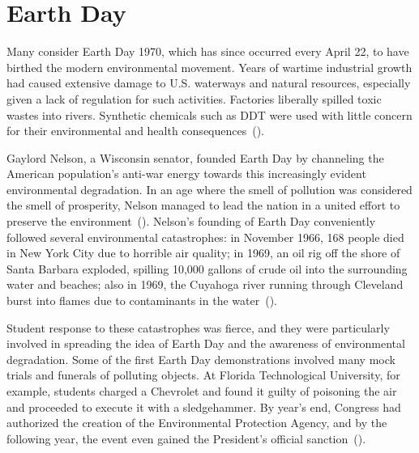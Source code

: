 \documentclass[12pt,letterpaper]{article}
\renewcommand{\citep}[1]{(\cite{#1})}
\begin{document}
%

\section*{Earth Day}

Many consider Earth Day 1970, which has since occurred every April 22, to have
birthed the modern environmental movement. Years of wartime industrial growth
had caused extensive damage to U.S. waterways and natural resources, especially
given a lack of regulation for such activities. Factories liberally spilled
toxic wastes into rivers. Synthetic chemicals such as DDT were used with little
concern for their environmental and health consequences~\citep{green2015}.

Gaylord Nelson, a Wisconsin senator, founded Earth Day by channeling the
American population's anti-war energy towards this increasingly evident
environmental degradation. In an age where the smell of pollution was
considered the smell of prosperity, Nelson managed to lead the nation in
a united effort to preserve the environment~\citep{edn2015}. Nelson's founding
of Earth Day conveniently followed several environmental catastrophes: in
November 1966, 168 people died in New York City due to horrible air quality; in
1969, an oil rig off the shore of Santa Barbara exploded, spilling 10,000
gallons of crude oil into the surrounding water and beaches; also in 1969, the
Cuyahoga river running through Cleveland burst into flames due to contaminants
in the water~\citep{green2015}.

Student response to these catastrophes was fierce, and they were particularly
involved in spreading the idea of Earth Day and the awareness of environmental
degradation. Some of the first Earth Day demonstrations involved many mock
trials and funerals of polluting objects. At Florida Technological University,
for example, students charged a Chevrolet and found it guilty of poisoning the
air and proceeded to execute it with a sledgehammer. By year's end, Congress
had authorized the creation of the Environmental Protection Agency, and by the
following year, the event even gained the President's official
sanction~\citep{latson2015}.
\end{document}
